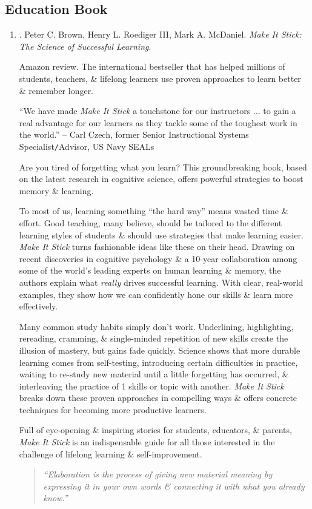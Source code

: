 \documentclass{article}
\begin{document}
\subsection{Education Book}

\begin{enumerate}
	\item \cite{Brown_Roediger_McDaniel_stick}. {\sc Peter C. Brown, Henry L. Roediger III, Mark A. McDaniel}. {\it Make It Stick: The Science of Successful Learning}.
	
	{\sf Amazon review.} The international bestseller that has helped millions of students, teachers, \& lifelong learners use proven approaches to learn better \& remember longer.
	
	``We have made {\it Make It Stick} a touchstone for our instructors $\ldots$ to gain a real advantage for our learners as they tackle some of the toughest work in the world.'' -- {\sc Carl Czech}, former Senior Instructional Systems Specialist{\tt/}Advisor, US Navy SEALs
	
	Are you tired of forgetting what you learn? This groundbreaking book, based on the latest research in cognitive science, offers powerful strategies to boost memory \& learning.
	
	To most of us, learning something ``the hard way'' means wasted time \& effort. Good teaching, many believe, should be tailored to the different learning styles of students \& should use strategies that make learning easier. {\it Make It Stick} turns fashionable ideas like these on their head. Drawing on recent discoveries in cognitive psychology \& a 10-year collaboration among some of the world's leading experts on human learning \& memory, the authors explain what {\it really} drives successful learning. With clear, real-world examples, they show how we can confidently hone our skills \& learn more effectively.
	
	Many common study habits simply don't work. Underlining, highlighting, rereading, cramming, \& single-minded repetition of new skills create the illusion of mastery, but gains fade quickly. Science shows that more durable learning comes from self-testing, introducing certain difficulties in practice, waiting to re-study new material until a little forgetting has occurred, \& interleaving the practice of 1 skills or topic with another. {\it Make It Stick} breaks down these proven approaches in compelling ways \& offers concrete techniques for becoming more productive learners.
	
	Full of eye-opening \& inspiring stories for students, educators, \& parents, {\it Make It Stick} is an indispensable guide for all those interested in the challenge of lifelong learning \& self-improvement.
	\begin{quotation}
		{\it``Elaboration is the process of giving new material meaning by expressing it in your own words \& connecting it with what you already know.''}
		

\end{quotation}
\end{enumerate}
\end{document}
